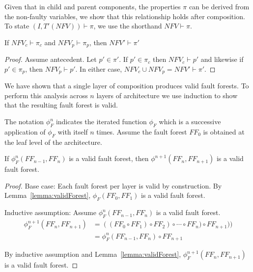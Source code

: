 Given that in child and parent components, the properties $\pi$ can be derived from the non-faulty variables, we show that this relationship holds after composition. To state $(I, T'(\mathit{NFV})) \vdash \pi$, we use the shorthand $\mathit{NFV} \vdash \pi$. 

\begin{theorem} If $\mathit{NFV}_c \vdash \pi_c$ and $\mathit{NFV}_p \vdash \pi_p$, then $\mathit{NFV}' \vdash \pi'$
\begin{proof}
Assume antecedent. Let $p' \in \pi'$. If $p' \in \pi_c$ then $\mathit{NFV}_c \vdash p'$ and likewise if $p' \in \pi_p$, then $\mathit{NFV}_p \vdash p'$. In either case, $\mathit{NFV}_c \cup \mathit{NFV}_p = \mathit{NFV}' \vdash \pi'$.
\end{proof}
\end{theorem} 


We have shown that a single layer of composition produces valid fault forests. To perform this analysis across $n$ layers of architecture we use induction to show that the resulting fault forest is valid. 

The notation $\phi_F^n$ indicates the iterated function $\phi_F$ which is a successive application of $\phi_F$ with itself $n$ times. Assume the fault forest $\mathit{FF_0}$ is obtained at the leaf level of the architecture.

\begin{theorem} If $\phi_F^n(\mathit{FF_{n-1}}, \mathit{FF_n})$ is a valid fault forest, then $\phi^{n+1}(\mathit{FF_n}, \mathit{FF_{n+1}})$ is a valid fault forest.
\begin{proof}

Base case: Each fault forest per layer is valid by construction. By Lemma~\ref{lemma:validForest}, $\phi_F(\mathit{FF_0}, \mathit{FF_1})$ is a valid fault forest.

Inductive assumption: Assume $\phi_F^n(\mathit{FF_{n-1}}, \mathit{FF_n})$ is a valid fault forest.
\begin{equation*}
\begin{split}
\phi_F^{n+1}(\mathit{FF_n}, \mathit{FF_{n+1}}) &= ((\mathit{FF_0} \circ \mathit{FF_1}) \circ \mathit{FF}_2) \circ \cdots \circ \mathit{FF_n}) \circ \mathit{FF_{n+1}})) \\
  &= \phi_F^n(\mathit{FF_{n-1}}, \mathit{FF_n}) \circ \mathit{FF_{n+1}}
\end{split}
\end{equation*}


By inductive assumption and Lemma~\ref{lemma:validForest}, $\phi_F^{n+1}(\mathit{FF_n}, \mathit{FF_{n+1}})$ is a valid fault forest.

\end{proof}
\label{thm:indForest}
\end{theorem}

